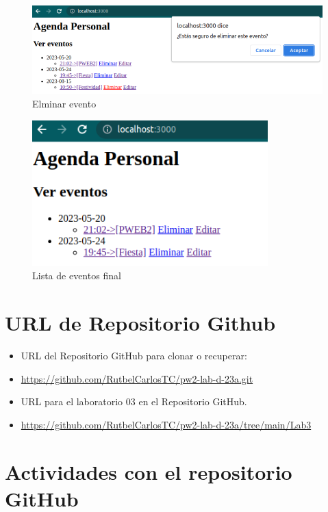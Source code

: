 \documentclass{article}
\begin{document}
\begin{figure}[H]
    \centering
    \includegraphics[scale=0.5]{img/exe/elminar-evento.png}
    \caption{Elminar evento}
\end{figure}
\begin{figure}[H]
    \centering
    \includegraphics[scale=0.5]{img/exe/lista-eventos-final.png}
    \caption{Lista de eventos final}
\end{figure}


\section{URL de Repositorio Github}
\begin{itemize}
	\item URL del Repositorio GitHub para clonar o recuperar:
	\item \url{https://github.com/RutbelCarlosTC/pw2-lab-d-23a.git}
	\item URL para el laboratorio 03 en el Repositorio GitHub.
	\item \url{https://github.com/RutbelCarlosTC/pw2-lab-d-23a/tree/main/Lab3}
\end{itemize}

\section{Actividades con el repositorio GitHub}
\end{document}
